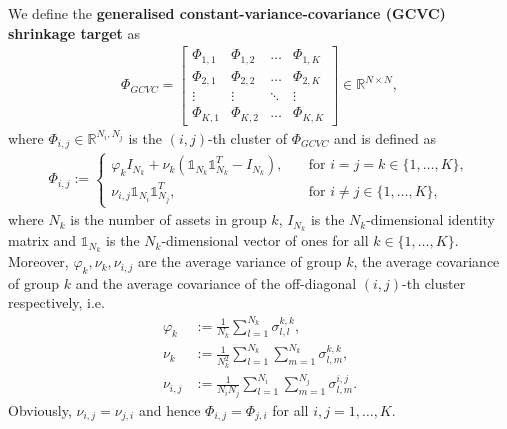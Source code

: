 \begin{definition}
            We define the \textbf{generalised constant-variance-covariance (GCVC) shrinkage target} as
            \begin{align*}
                \Phi_{GCVC} = \begin{bmatrix}
                \Phi_{1,1} & \Phi_{1,2} & \dots & \Phi_{1,K} \\
                \Phi_{2,1} & \Phi_{2,2} & \dots & \Phi_{2,K} \\
                \vdots & \vdots & \ddots & \vdots \\
                \Phi_{K,1} & \Phi_{K,2} & \dots & \Phi_{K,K}
                \end{bmatrix} \in \mathbb{R}^{N \times N},
            \end{align*}
            where $\Phi_{i,j} \in \mathbb{R}^{N_i, N_j}$ is the $(i,j)$-th cluster of $\Phi_{GCVC}$ and is defined as
            \begin{align*}
                \Phi_{i,j} := \begin{cases}
                \varphi_k I_{N_k} + \nu_k \left( \mathds{1}_{N_k} \mathds{1}_{N_k}^T - I_{N_k} \right), \quad &\text{for } i = j = k \in \{ 1, \dots, K \}, \\
                \nu_{i,j} \mathds{1}_{N_i} \mathds{1}_{N_j}^T, \quad &\text{for } i \neq j \in \{ 1, \dots, K \},
                \end{cases}
            \end{align*}
            where $N_k$ is the number of assets in group $k$, $I_{N_k}$ is the $N_k$-dimensional identity matrix and $\mathds{1}_{N_k}$ is the $N_k$-dimensional vector of ones for all $k \in \{ 1, \dots, K \}$. Moreover, $\varphi_k, \nu_k, \nu_{i,j}$ are the average variance of group $k$, the average covariance of group $k$ and the average covariance of the off-diagonal $(i,j)$-th cluster respectively, i.e.
            \begin{align*}
                \varphi_k &:= \frac{1}{N_k} \sum_{l=1}^{N_k} \sigma_{l,l}^{k,k}, \\
                \nu_k &:= \frac{1}{N_k^2} \sum_{l=1}^{N_k} \sum_{m=1}^{N_k} \sigma_{l,m}^{k,k}, \\
                \nu_{i,j} &:= \frac{1}{N_i N_j} \sum_{l=1}^{N_i} \sum_{m=1}^{N_j} \sigma_{l,m}^{i,j}.
            \end{align*}
            Obviously, $\nu_{i,j} = \nu_{j,i}$ and hence $\Phi_{i,j} = \Phi_{j,i}$ for all $i,j = 1, \dots, K$.
        \end{definition}
        
